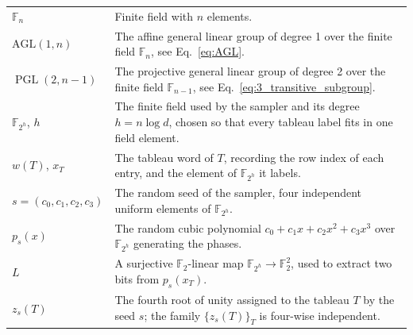\documentclass[11pt,letterpaper]{article}
\theoremstyle{plain}
\theoremstyle{plain}
\theoremstyle{plain}
\theoremstyle{plain}
\theoremstyle{plain}
\theoremstyle{plain}
\theoremstyle{plain}
\theoremstyle{definition}
\theoremstyle{plain}
\begin{document}
\begin{tabular}{@{}ll@{}}

\parbox[t]{0.22\textwidth}{$\mathbb{F}_n$} & \parbox[t]{0.72\textwidth}{Finite field with $n$ elements.} \\[0.6em]

\parbox[t]{0.22\textwidth}{$\mathrm{AGL}(1, n)$} & \parbox[t]{0.72\textwidth}{The affine general linear group of degree 1 over the finite field $\mathbb{F}_n$, see Eq.~\eqref{eq:AGL}.} \\[0.6em]

\parbox[t]{0.22\textwidth}{$\operatorname{PGL}(2, n-1)$} & \parbox[t]{0.72\textwidth}{The projective general linear group of degree 2 over the finite field $\mathbb{F}_{n-1}$, see Eq.~\eqref{eq:3_transitive_subgroup}.} \\[0.6em]

\parbox[t]{0.22\textwidth}{$\mathbb F_{2^h}$, $h$} & \parbox[t]{0.72\textwidth}{The finite field used by the sampler and its degree $h=n\log d$, chosen so that every tableau label fits in one field element.} \\[0.6em]

\parbox[t]{0.22\textwidth}{$w(T)$, $x_T$} & \parbox[t]{0.72\textwidth}{The tableau word of $T$, recording the row index of each entry, and the element of $\mathbb F_{2^h}$ it labels.} \\[0.6em]

\parbox[t]{0.22\textwidth}{$s=(c_0,c_1,c_2,c_3)$} & \parbox[t]{0.72\textwidth}{The random seed of the sampler, four independent uniform elements of $\mathbb F_{2^h}$.} \\[0.6em]

\parbox[t]{0.22\textwidth}{$p_s(x)$} & \parbox[t]{0.72\textwidth}{The random cubic polynomial $c_0+c_1x+c_2x^2+c_3x^3$ over $\mathbb F_{2^h}$ generating the phases.} \\[0.6em]

\parbox[t]{0.22\textwidth}{$L$} & \parbox[t]{0.72\textwidth}{A surjective $\mathbb F_2$-linear map $\mathbb F_{2^h}\to\mathbb F_2^2$, used to extract two bits from $p_s(x_T)$.} \\[0.6em]

\parbox[t]{0.22\textwidth}{$z_s(T)$} & \parbox[t]{0.72\textwidth}{The fourth root of unity assigned to the tableau $T$ by the seed $s$; the family $\{z_s(T)\}_T$ is four-wise independent.} \\[0.6em]

\end{tabular}
\end{document}
